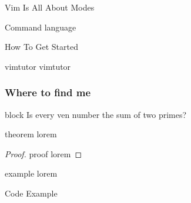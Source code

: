 \documentclass{beamer}
\begin{document}
\begin{frame}{Vim Is All About Modes}
\end{frame}
\usebackgroundtemplate{}

\begin{frame}{Command language}
\end{frame}

\begin{frame}{How To Get Started}
    \begin{block}{vimtutor}
        vimtutor
    \end{block}
\end{frame}

\begin{frame}
    \frametitle{Where to find me}
    \begin{block}{block}
        Is every \alert{ven} number the sum of two primes?
    \end{block}
    \begin{theorem}
        theorem lorem
    \end{theorem}
    \begin{proof}
        proof lorem
    \end{proof}
    \begin{example}
        example lorem
    \end{example}
\end{frame}

\begin{frame}[fragile]{Code Example}
    \inputminted{js}{codes/example.js}
\end{frame}
\end{document}
